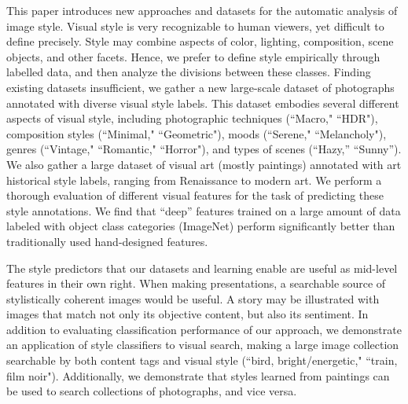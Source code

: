 This paper introduces new approaches and datasets for the automatic analysis of image style.
Visual style is very recognizable to human viewers, yet difficult to define precisely. Style may combine aspects of color, lighting, composition, scene objects, and other facets. Hence, we prefer to define style empirically through labelled data, and then analyze the divisions between these classes.
Finding existing datasets insufficient, %
we gather a new large-scale dataset of photographs annotated with diverse visual style labels.
This dataset embodies several different aspects of visual style, including photographic techniques (``Macro," ``HDR"), composition styles (``Minimal," ``Geometric"),
moods (``Serene," ``Melancholy"), genres (``Vintage," ``Romantic," ``Horror"),
and types of scenes (``Hazy,'' ``Sunny''). %
We  also gather a large dataset of visual art (mostly paintings) annotated with art historical style labels, ranging from Renaissance to modern art.
We perform a thorough evaluation of different visual features for the task of predicting these style annotations.
We find that ``deep'' features trained on a large amount of data labeled with object class categories (ImageNet) perform significantly better than traditionally used hand-designed features.

The style predictors that our datasets and learning enable are useful as mid-level features in their own right.
When making presentations, a searchable source of stylistically coherent images would be useful.
A story may be illustrated with images that match not only its objective content, but also its sentiment.
In addition to evaluating classification performance of our approach, we demonstrate an application of style classifiers to visual search, making a large image collection searchable by both content tags and visual style (``bird, bright/energetic," ``train, film noir").
Additionally, we demonstrate that styles learned from paintings can be used to search collections of photographs, and vice versa.


